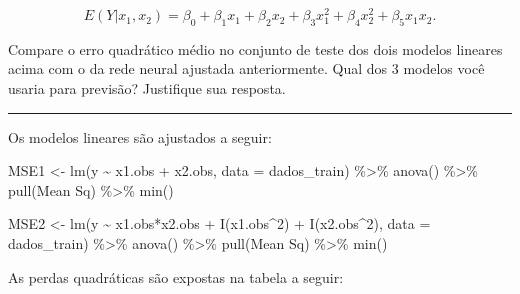 \documentclass[
  a4paperpaper,
]{article}
\newenvironment{Shaded}{\begin{snugshade}}{\end{snugshade}}
\newcommand{\AttributeTok}[1]{\textcolor[rgb]{0.40,0.45,0.13}{#1}}
\newcommand{\DecValTok}[1]{\textcolor[rgb]{0.68,0.00,0.00}{#1}}
\newcommand{\FunctionTok}[1]{\textcolor[rgb]{0.28,0.35,0.67}{#1}}
\newcommand{\NormalTok}[1]{\textcolor[rgb]{0.00,0.23,0.31}{#1}}
\newcommand{\OtherTok}[1]{\textcolor[rgb]{0.00,0.23,0.31}{#1}}
\newcommand{\SpecialCharTok}[1]{\textcolor[rgb]{0.37,0.37,0.37}{#1}}
\newcommand{\StringTok}[1]{\textcolor[rgb]{0.13,0.47,0.30}{#1}}
\begin{document}
\[
E(Y|x_1, x_2) = \beta_0 + \beta_1 x_{1} + \beta_2 x_{2} + \beta_3 x_1^2 + \beta_4 x_2^2 + \beta_5 x_1 x_2.
\]

Compare o erro quadrático médio no conjunto de teste dos dois modelos
lineares acima com o da rede neural ajustada anteriormente. Qual dos 3
modelos você usaria para previsão? Justifique sua resposta.

\begin{center}\rule{0.5\linewidth}{0.5pt}\end{center}

Os modelos lineares são ajustados a seguir:

\begin{Shaded}
\begin{Highlighting}[]
\NormalTok{MSE1 }\OtherTok{\textless{}{-}} \FunctionTok{lm}\NormalTok{(y }\SpecialCharTok{\textasciitilde{}}\NormalTok{ x1.obs }\SpecialCharTok{+}\NormalTok{ x2.obs, }\AttributeTok{data =}\NormalTok{ dados\_train) }\SpecialCharTok{\%\textgreater{}\%}
  \FunctionTok{anova}\NormalTok{() }\SpecialCharTok{\%\textgreater{}\%} 
  \FunctionTok{pull}\NormalTok{(}\StringTok{\textasciigrave{}}\AttributeTok{Mean Sq}\StringTok{\textasciigrave{}}\NormalTok{) }\SpecialCharTok{\%\textgreater{}\%}
  \FunctionTok{min}\NormalTok{()}

\NormalTok{MSE2 }\OtherTok{\textless{}{-}} \FunctionTok{lm}\NormalTok{(y }\SpecialCharTok{\textasciitilde{}}\NormalTok{ x1.obs}\SpecialCharTok{*}\NormalTok{x2.obs }\SpecialCharTok{+} \FunctionTok{I}\NormalTok{(x1.obs}\SpecialCharTok{\^{}}\DecValTok{2}\NormalTok{) }\SpecialCharTok{+} \FunctionTok{I}\NormalTok{(x2.obs}\SpecialCharTok{\^{}}\DecValTok{2}\NormalTok{), }\AttributeTok{data =}\NormalTok{ dados\_train) }\SpecialCharTok{\%\textgreater{}\%}
  \FunctionTok{anova}\NormalTok{() }\SpecialCharTok{\%\textgreater{}\%} 
  \FunctionTok{pull}\NormalTok{(}\StringTok{\textasciigrave{}}\AttributeTok{Mean Sq}\StringTok{\textasciigrave{}}\NormalTok{) }\SpecialCharTok{\%\textgreater{}\%}
  \FunctionTok{min}\NormalTok{()}
\end{Highlighting}
\end{Shaded}

As perdas quadráticas são expostas na tabela a seguir:

\label{tbl-MSE}
\begin{Shaded}
\end{Shaded}
\end{document}
